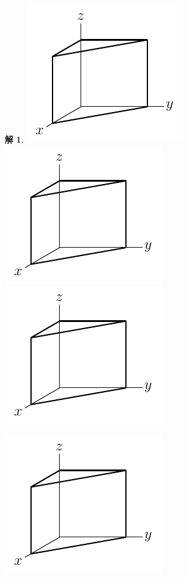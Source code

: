 \documentclass[12pt]{extarticle}
\theoremstyle{definition}
\newtheorem*{sol}{解}
\begin{document}
{\begin{sol}
  \begin{minipage}{0.23\textwidth}
    \includegraphics[scale=0.62,page=7]{fig/text.pdf} \\
    \includegraphics[scale=0.62,page=8]{fig/text.pdf} \\
    \includegraphics[scale=0.62,page=10]{fig/text.pdf} 
  \end{minipage}
  \begin{minipage}{0.23\textwidth}
    \includegraphics[scale=0.62,page=9]{fig/text.pdf} \\

\end{minipage}
\end{sol}}
\end{document}
